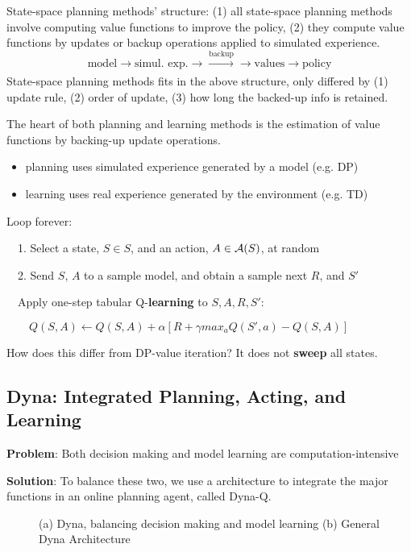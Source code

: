 \documentclass[sutton_barto_notes.tex]{subfiles}
\begin{document}
State-space planning methods' structure: (1) all state-space planning methods involve computing value functions to improve the policy, (2) they compute value functions by updates or backup operations applied to simulated experience.
$$ \text{model} \rightarrow \text{simul. exp.} \rightarrow \xrightarrow[]{\text{backup}} \rightarrow \text{values} \rightarrow \text{policy} $$
State-space planning methods fits in the above structure, only differed by (1) update rule, (2) order of update, (3) how long the backed-up info is retained.

The heart of both planning and learning methods is the estimation of value functions by backing-up update operations.
\begin{itemize}
\item planning uses simulated experience generated by a model (e.g. DP)
\item learning uses real experience generated by the environment (e.g. TD)
\end{itemize}


\begin{tcolorbox}[width=1.1\textwidth,title={Random-sample one-step tabular Q-\textbf{planning}}]
Loop forever:

$\quad$1. Select a state, $S \in S$, and an action, $A \in \operatorname*{\mathcal{A}}(S)$, at random

$\quad$2. Send $S$, $A$ to a sample model, and obtain a sample next $R$, and $S'$

$\quad$Apply one-step tabular Q-\textbf{learning} to $S,A,R,S'$:

$\quad\quad Q(S,A)\leftarrow Q(S,A) + \alpha [R + \gamma max_a Q(S',a) - Q(S,A)]$
\end{tcolorbox}

How does this differ from DP-value iteration? It does not \textbf{sweep} all states.


\subsection{Dyna: Integrated Planning, Acting, and Learning}

\textbf{Problem}: Both decision making and model learning are computation-intensive

\textbf{Solution}: To balance these two, we use a architecture to integrate the major functions in an online planning agent, called Dyna-Q.

\begin{figure}[!h]
    \centering
    \caption{ (a) Dyna, balancing decision making and model learning (b) General Dyna Architecture }
    \label{fig:dyna}
\end{figure}
\end{document}
